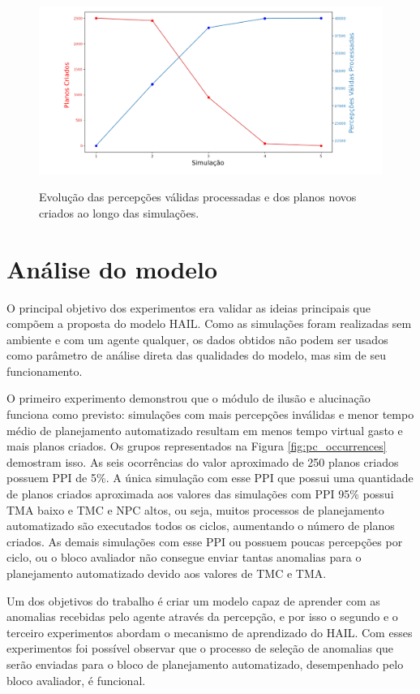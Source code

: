 \begin{figure}
    \centering
    \caption{Evolução das percepções válidas processadas e dos planos novos criados ao longo das simulações.}
    \includegraphics[width=\textwidth]{images/perceptions_vs_plans.png}
    \label{fig:perceptions_v_plans-experiment3}
\end{figure}

\section{Análise do modelo}

O principal objetivo dos experimentos era validar as ideias principais que compõem a proposta do modelo HAIL. Como as simulações foram realizadas sem ambiente e com um agente qualquer, os dados obtidos não podem ser usados como parâmetro de análise direta das qualidades do modelo, mas sim de seu funcionamento.

O primeiro experimento demonstrou que o módulo de ilusão e alucinação funciona como previsto: simulações com mais percepções inválidas e menor tempo médio de planejamento automatizado resultam em menos tempo virtual gasto e mais planos criados. Os grupos representados na Figura \ref{fig:pc_occurrences} demostram isso. As seis ocorrências do valor aproximado de 250 planos criados possuem PPI de 5\%. A única simulação com esse PPI que possui uma quantidade de planos criados aproximada aos valores das simulações com PPI 95\% possui TMA baixo e TMC e NPC altos, ou seja, muitos processos de planejamento automatizado são executados todos os ciclos, aumentando o número de planos criados. As demais simulações com esse PPI ou possuem poucas percepções por ciclo, ou o bloco avaliador não consegue enviar tantas anomalias para o planejamento automatizado devido aos valores de TMC e TMA.

Um dos objetivos do trabalho é criar um modelo capaz de aprender com as anomalias recebidas pelo agente através da percepção, e por isso o segundo e o terceiro experimentos abordam o mecanismo de aprendizado do HAIL. Com esses experimentos foi possível observar que o processo de seleção de anomalias que serão enviadas para o bloco de planejamento automatizado, desempenhado pelo bloco avaliador, é funcional.

